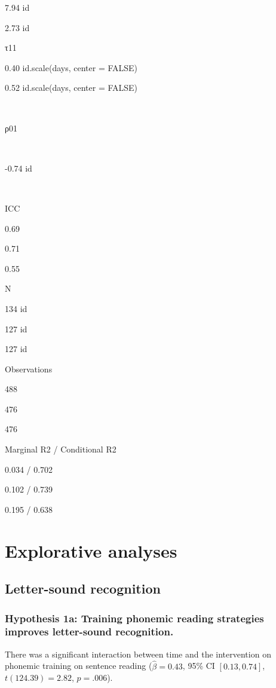 \documentclass[
  english,
  ,man]{apa6}
\begin{document}
7.94 id

2.73 id

τ11

0.40 id.scale(days, center = FALSE)

0.52 id.scale(days, center = FALSE)

~

ρ01

~

-0.74 id

~

ICC

0.69

0.71

0.55

N

134 id

127 id

127 id

Observations

488

476

476

Marginal R2 / Conditional R2

0.034 / 0.702

0.102 / 0.739

0.195 / 0.638

\hypertarget{explorative-analyses}{%
\section{Explorative analyses}\label{explorative-analyses}}

\hypertarget{letter-sound-recognition}{%
\subsection{Letter-sound recognition}\label{letter-sound-recognition}}

\hypertarget{hypothesis-1a-training-phonemic-reading-strategies-improves-letter-sound-recognition.}{%
\subsubsection{Hypothesis 1a: Training phonemic reading strategies improves letter-sound recognition.}\label{hypothesis-1a-training-phonemic-reading-strategies-improves-letter-sound-recognition.}}

There was a significant interaction between time and the intervention on phonemic training on sentence reading (\(\hat{\beta} = 0.43\), 95\% CI \([0.13, 0.74]\), \(t(124.39) = 2.82\), \(p = .006\)).
\end{document}
